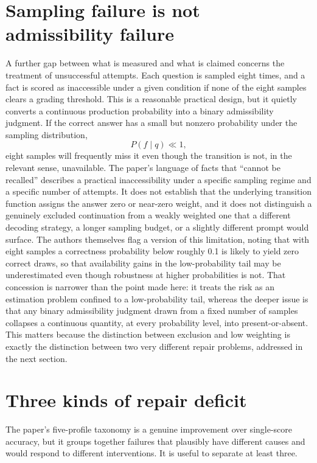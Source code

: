 \documentclass[11pt]{article}
\begin{document}
\section{Sampling failure is not admissibility failure}

A further gap between what is measured and what is claimed concerns the treatment of unsuccessful attempts. Each question is sampled eight times, and a fact is scored as inaccessible under a given condition if none of the eight samples clears a grading threshold. This is a reasonable practical design, but it quietly converts a continuous production probability into a binary admissibility judgment. If the correct answer has a small but nonzero probability under the sampling distribution,
\[
P(f \mid q) \ll 1,
\]
eight samples will frequently miss it even though the transition is not, in the relevant sense, unavailable. The paper's language of facts that ``cannot be recalled'' describes a practical inaccessibility under a specific sampling regime and a specific number of attempts. It does not establish that the underlying transition function assigns the answer zero or near-zero weight, and it does not distinguish a genuinely excluded continuation from a weakly weighted one that a different decoding strategy, a longer sampling budget, or a slightly different prompt would surface. The authors themselves flag a version of this limitation, noting that with eight samples a correctness probability below roughly 0.1 is likely to yield zero correct draws, so that availability gains in the low-probability tail may be underestimated even though robustness at higher probabilities is not. That concession is narrower than the point made here: it treats the risk as an estimation problem confined to a low-probability tail, whereas the deeper issue is that any binary admissibility judgment drawn from a fixed number of samples collapses a continuous quantity, at every probability level, into present-or-absent. This matters because the distinction between exclusion and low weighting is exactly the distinction between two very different repair problems, addressed in the next section.

\section{Three kinds of repair deficit}

The paper's five-profile taxonomy is a genuine improvement over single-score accuracy, but it groups together failures that plausibly have different causes and would respond to different interventions. It is useful to separate at least three.
\end{document}
